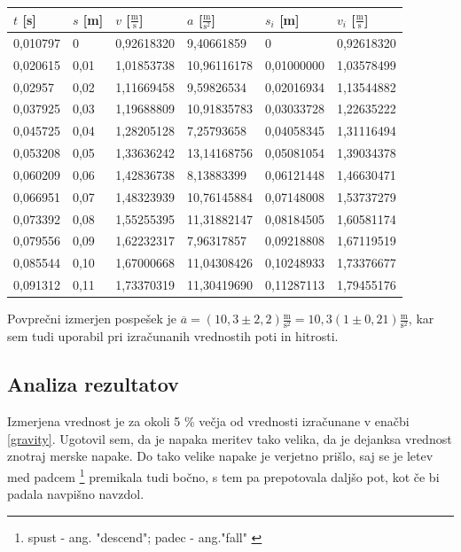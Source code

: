 \documentclass[12pt]{article}
\begin{document}
	\begin{table}[h!]
		\centering
		\begin{tabular}{|l|l|l|l|l|l|}
		\hline
		$t$ [s] 	& $s$ [m] 	& $v$ [$\frac{\text{m}}{\text{s}}$] & $a$ [$\frac{\text{m}}{\text{s}^2}$] 	& $s_i$ [m] 	& $v_i$ [$\frac{\text{m}}{\text{s}}$] 	\\ \hline
		0,010797	& 0			& 0,92618320						&  9,40661859							& 0				& 0,92618320							\\ \hline
		0,020615	& 0,01		& 1,01853738						& 10,96116178							& 0,01000000	& 1,03578499							\\ \hline
		0,02957		& 0,02		& 1,11669458						&  9,59826534							& 0,02016934	& 1,13544882							\\ \hline
		0,037925	& 0,03		& 1,19688809						& 10,91835783							& 0,03033728	& 1,22635222							\\ \hline
		0,045725	& 0,04		& 1,28205128						&  7,25793658							& 0,04058345	& 1,31116494							\\ \hline
		0,053208	& 0,05		& 1,33636242						& 13,14168756							& 0,05081054	& 1,39034378							\\ \hline
		0,060209	& 0,06		& 1,42836738						&  8,13883399							& 0,06121448	& 1,46630471							\\ \hline
		0,066951	& 0,07		& 1,48323939						& 10,76145884							& 0,07148008	& 1,53737279							\\ \hline
		0,073392	& 0,08		& 1,55255395						& 11,31882147							& 0,08184505	& 1,60581174							\\ \hline
		0,079556	& 0,09		& 1,62232317						&  7,96317857							& 0,09218808	& 1,67119519							\\ \hline
		0,085544	& 0,10		& 1,67000668						& 11,04308426							& 0,10248933	& 1,73376677							\\ \hline
		0,091312	& 0,11		& 1,73370319						& 11,30419690							& 0,11287113	& 1,79455176							\\ \hline
		\end{tabular}
	\end{table}

	Povprečni izmerjen pospešek je $\overline{a} = (10,3 \pm 2,2) \frac{\text{m}}{\text{s}^2} = 10,3 (1 \pm 0,21) \frac{\text{m}}{\text{s}^2}$, kar
	sem tudi uporabil pri izračunanih vrednostih poti in hitrosti.
 	\subsection*{Analiza rezultatov}
	Izmerjena vrednost je za okoli 5 \% večja od vrednosti izračunane v enačbi \eqref{gravity}.
	Ugotovil sem, da je napaka meritev tako velika, da je dejanksa vrednost znotraj merske
	napake. Do tako velike napake je verjetno prišlo, saj se je letev med padcem 
	\footnote{spust - ang. "descend"; padec - ang."fall" \cite{fallvsdescent}}
	premikala tudi bočno, s tem pa prepotovala daljšo pot, kot če bi padala navpišno navzdol.
\end{document}
